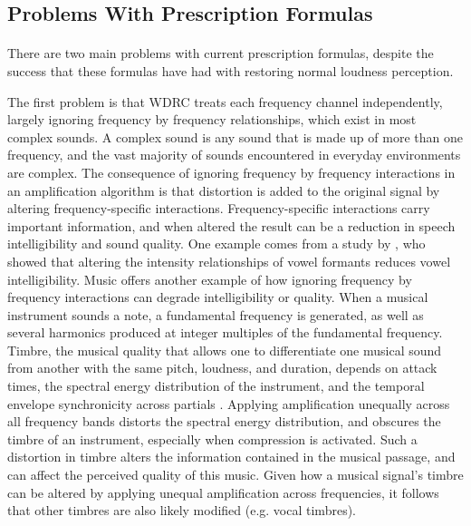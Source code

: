 \subsection{Problems With Prescription Formulas}
\paragraph{}There are two main problems with current prescription formulas, despite the success that these formulas have had with restoring normal loudness perception.

The first problem is that WDRC treats each frequency channel independently, largely ignoring frequency by frequency relationships, which exist in most complex sounds.  A complex sound is any sound that is made up of more than one frequency, and the vast majority of sounds encountered in everyday environments are complex.  The consequence of ignoring frequency by frequency interactions in an amplification algorithm is that distortion is added to the original signal by altering frequency-specific interactions.  Frequency-specific interactions carry important information, and when altered the result can be a reduction in speech intelligibility and sound quality.  One example comes from a study by , who showed that altering the intensity relationships of vowel formants reduces vowel intelligibility.  Music offers another example of how ignoring frequency by frequency interactions can degrade intelligibility or quality.  When a musical instrument sounds a note, a fundamental frequency is generated, as well as several harmonics produced at integer multiples of the fundamental frequency.  Timbre, the musical quality that allows one to differentiate one musical sound from another with the same pitch, loudness, and duration, depends on attack times, the spectral energy distribution of the instrument, and the temporal envelope synchronicity across partials \cite{Grey1977}.  Applying amplification unequally across all frequency bands distorts the spectral energy distribution, and obscures the timbre of an instrument, especially when compression is activated.  Such a distortion in timbre alters the information contained in the musical passage, and can affect the perceived quality of this music.  Given how a musical signal's timbre can be altered by applying unequal amplification across frequencies, it follows that other timbres are also likely modified (e.g. vocal timbres).

